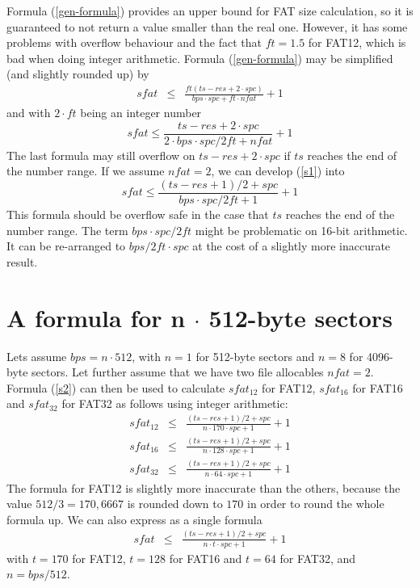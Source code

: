 \documentclass[12pt]{article}
\begin{document}
Formula (\ref{gen-formula}) provides an upper bound for FAT size calculation, so it is guaranteed to not return a value smaller than the real one. However, it has some problems with overflow behaviour and the fact that $ft = 1.5$ for FAT12, which is bad when doing integer arithmetic. Formula (\ref{gen-formula}) may be simplified (and slightly rounded up) by
\begin{eqnarray}
sfat &\le& \frac{ft(ts - res + 2 \cdot spc)}{bps \cdot spc + ft \cdot nfat} + 1 \nonumber
\end{eqnarray}
and with $2 \cdot ft$ being an integer number
\begin{equation}
\label{s1}
sfat \le \frac{ts - res + 2 \cdot spc}{2 \cdot bps \cdot spc / 2 ft + nfat} + 1
\end{equation}
The last formula may still overflow on $ts - res + 2 \cdot spc$ if $ts$ reaches the end of the number range. If we assume $nfat = 2$, we can develop (\ref{s1}) into
\begin{equation}
\label{s2}
sfat \le \frac{(ts - res + 1) / 2 + spc}{bps \cdot spc / 2 ft + 1} + 1
\end{equation}
This formula should be overflow safe in the case that $ts$ reaches the end of the number range. The term $bps \cdot spc / 2 ft$ might be problematic on 16-bit arithmetic. It can be re-arranged to $bps / 2 ft \cdot spc$ at the cost of a slightly more inaccurate result.


\section{A formula for n $\cdot$ 512-byte sectors}
Lets assume $bps = n \cdot 512$, with $n = 1$ for 512-byte sectors and $n = 8$ for 4096-byte sectors. Let further assume that we have two file allocables $nfat = 2$. Formula (\ref{s2}) can then be used to calculate $sfat_{12}$ for FAT12, $sfat_{16}$ for FAT16 and $sfat_{32}$ for FAT32 as follows using integer arithmetic:
\begin{eqnarray}
sfat_{12} &\le& \frac{(ts - res + 1) / 2 + spc}{n \cdot 170\cdot spc + 1} + 1\\
sfat_{16} &\le& \frac{(ts - res + 1) / 2 + spc}{n \cdot 128 \cdot spc + 1} + 1\\
sfat_{32} &\le& \frac{(ts - res + 1) / 2 + spc}{n \cdot 64 \cdot spc + 1} + 1
\end{eqnarray}
The formula for FAT12 is slightly more inaccurate than the others, because the value $512 / 3 = 170,6667$ is rounded down to $170$ in order to round the whole formula up. We can also express as a single formula
\begin{eqnarray}
sfat &\le& \frac{(ts - res + 1) / 2 + spc}{n \cdot t \cdot spc + 1} + 1
\end{eqnarray}
with $t = 170$ for FAT12, $t = 128$ for FAT16 and $t = 64$ for FAT32, and $n = bps / 512$.
\end{document}

